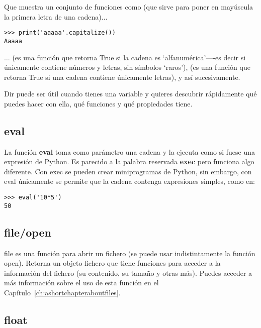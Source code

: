 Que muestra un conjunto de funciones como  (que sirve para poner en mayúscula la primera letra de una cadena)$\ldots$

\begin{listing}
\begin{verbatim}
>>> print('aaaaa'.capitalize())
Aaaaa
\end{verbatim}
\end{listing}

$\ldots$ (es una función que retorna True si la cadena es `alfanumérica'----es decir si únicamente contiene números y letras, sin símbolos `raros'),  (es una función que retorna True si una cadena contiene únicamente letras), y así sucesivamente. 

Dir puede ser útil cuando tienes una variable y quieres descubrir rápidamente qué puedes hacer con ella, qué funciones y qué propiedades tiene.

\subsection*{eval}

La función \textbf{eval} toma como parámetro una cadena y la ejecuta como si fuese una expresión de Python.  Es parecido a la palabra reservada \textbf{exec} pero funciona algo diferente.  Con exec se pueden crear miniprogramas de Python, sin embargo, con eval únicamente se permite que la cadena contenga expresiones simples, como en:

\begin{listing}
\begin{verbatim}
>>> eval('10*5')
50
\end{verbatim}
\end{listing}

\subsection*{file/open}

file es una función para abrir un fichero (se puede usar indistintamente la función open). Retorna un objeto fichero que tiene funciones para acceder a la información del fichero (su contenido, su tamaño y otras más).   Puedes acceder a más información sobre el uso de esta función en el Capítulo~\ref{ch:ashortchapteraboutfiles}.

\subsection*{float}

